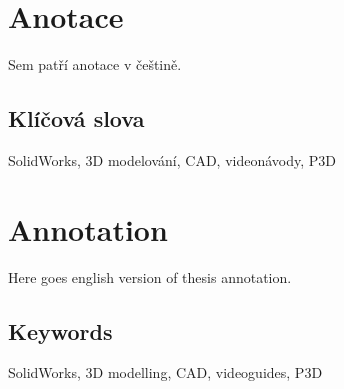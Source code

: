 \documentclass{template/template}
\author{Petr Štourač} %
\begin{document}

\maketitle




\pagestyle{empty}

\section*{Anotace}
Sem patří anotace v češtině.

\subsection*{Klíčová slova}
SolidWorks, 3D modelování, CAD, videonávody, P3D

\vspace{20mm}

\section*{Annotation}
Here goes english version of thesis annotation.


\subsection*{Keywords}
SolidWorks, 3D modelling, CAD, videoguides, P3D

\newpage
\pagestyle{plain}

\tableofcontents %

\setcounter{figure}{0}
\setcounter{table}{0}
\newpage



%






\newpage

\appendix
{}



\printbibliography[title=Literatura]

\listoffigures
{}

\listoftables
{}
\end{document}
